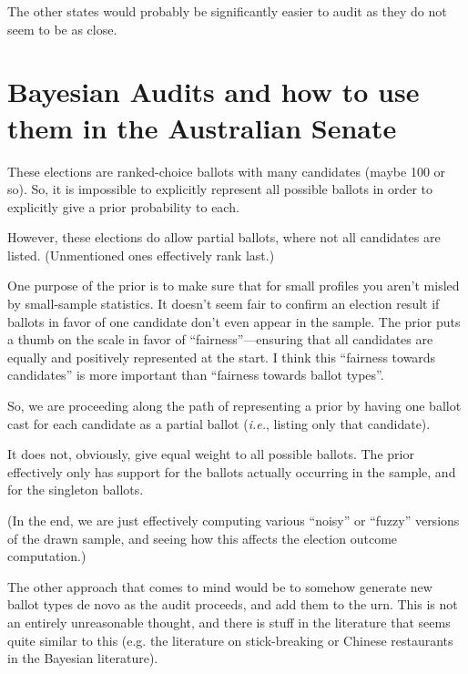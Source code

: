 \documentclass[10pt,a4paper]{article}
\newcommand{\VTNote}[1]{}
\newcommand{\longVersion}[1]{#1}
\newcommand{\longVersion}[1]{}
\begin{document}
The other states would probably be significantly easier to audit as they do not seem to be as close.

\longVersion{
\section{Bayesian Audits and how to use them in the Australian Senate}
\label{sec:bayes}
\VTNote{Currently just copying Ron's email.}

These elections are ranked-choice ballots with many candidates (maybe 100 or
so).  So, it is impossible to explicitly represent all possible ballots in
order to explicitly give a prior probability to each.  

However, these elections do allow partial ballots, where not
all candidates are listed. (Unmentioned ones effectively rank last.)

One purpose of the prior is to make sure that for small profiles you
aren't misled by small-sample statistics.  It doesn't seem fair
to confirm an election result if ballots in favor of one candidate don't
even appear in the sample.   The prior puts a thumb on the scale in
favor of ``fairness''---ensuring that all candidates are equally and
positively represented at the start.  I think this ``fairness towards
candidates'' is more important than ``fairness towards ballot types''.

So, we are proceeding along the path of representing a prior by
having one ballot cast for each candidate as a partial ballot ({\it i.e.},
listing only that candidate).  

It does not, obviously, give equal weight to all possible ballots.
The prior effectively only has support for the ballots actually 
occurring in the sample, and for the singleton ballots.  

(In the end, we are just effectively computing various ``noisy''
or ``fuzzy'' versions of the drawn sample, and seeing how this
affects the election outcome computation.)

The other approach that comes to mind would be to somehow generate
new ballot types de novo as the audit proceeds, and add them to
the urn.  This is not an entirely unreasonable thought, and there
is stuff in the literature that seems quite similar to this (e.g. the
literature on stick-breaking or Chinese restaurants in the Bayesian
literature).

}
\end{document}
